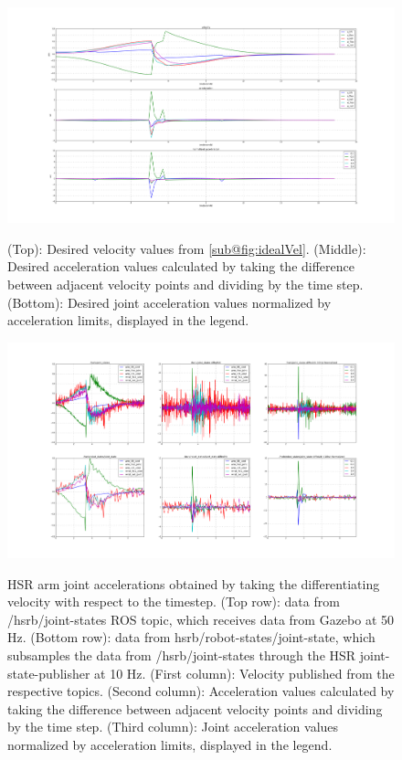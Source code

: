 \documentclass[12pt]{article}
\begin{document}
        \begin{figure}
            \centering
            \includegraphics[width=\linewidth]{2020.05.17/ideal_acc_9_6.png}
            \label{fig:accelerations_ideal}
            \caption{(Top): Desired velocity values from \cref{sub@fig:idealVel}. (Middle): Desired acceleration values calculated by taking the difference between adjacent velocity points and dividing by the time step. (Bottom): Desired joint acceleration values normalized by acceleration limits, displayed in the legend.} 
        \end{figure}   
        \begin{figure}
            \centering
            \includegraphics[width=\linewidth]{2020.05.17/accelerations_adjusted.png}
            \label{fig:accelerations_diffed}
            \caption{
                HSR arm joint accelerations obtained by taking the differentiating velocity with respect to the timestep. (Top row): data from /hsrb/joint-states ROS topic, which receives data from Gazebo at 50 Hz. (Bottom row): data from hsrb/robot-states/joint-state, which subsamples the data from /hsrb/joint-states through the HSR joint-state-publisher at 10 Hz. (First column): Velocity published from the respective topics. (Second column): Acceleration values calculated by taking the difference between adjacent velocity points and dividing by the time step. (Third column): Joint acceleration values normalized by acceleration limits, displayed in the legend.} 
        \end{figure}
        
\end{document}
